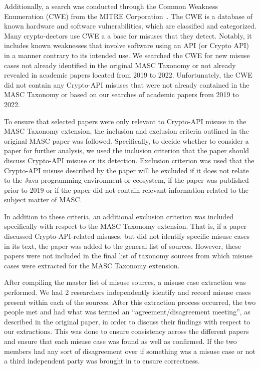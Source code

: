 Additionally, a search was conducted through the Common Weakness Enumeration (CWE) from the MITRE Corporation~.  The CWE is a database of known hardware and software vulnerabilities, which are classified and categorized. Many crypto-dectors use CWE a a base for misuses that they detect.  Notably, it includes known weaknesses that involve software using an API (or Crypto API) in a manner contrary to its intended use.  We searched the CWE for new misuse cases not already identified in the original MASC Taxonomy or not already revealed in academic papers located from 2019 to 2022.  Unfortunately, the CWE did not contain any Crypto-API misuses that were not already contained in the MASC Taxonomy or based on our searches of academic papers from 2019 to 2022. 

To ensure that selected papers were only relevant to Crypto-API misuse in the MASC Taxonomy extension, the inclusion and exclusion criteria outlined in the original MASC paper was followed.  Specifically, to decide whether to consider a paper for further analysis, we used the inclusion criterion that the paper should discuss Crypto-API misuse or its detection. Exclusion criterion was used that the Crypto-API misuse described by the paper will be excluded if it does not relate to the Java programming environment or ecosystem, if the paper was published prior to 2019 or if the paper did not contain relevant information related to the subject matter of MASC.
    
In addition to these criteria, an additional exclusion criterion was included specifically with respect to the MASC Taxonomy extension.  That is, if a paper discussed Crypto-API-related misuses, but did not identify specific misuse cases in its text, the paper was added to the general list of sources.  However, these papers were not included in the final list of taxonomy sources from which misuse cases were extracted for the MASC Taxonomy extension.

After compiling the master list of misuse sources, a misuse case extraction was performed. We had 2 researchers independently identify and record misuse cases present within each of the sources. After this extraction process occurred, the two people  met and had what was termed an “agreement/disagreement meeting”, as described in the original paper, in order to discuss their findings with respect to our extractions.  This was done to ensure consistency across the different papers and ensure that each misuse case was found as well as confirmed. If the two members had any sort of disagreement over if something was a misuse case or not a third independent party was brought in to ensure correctness. 

